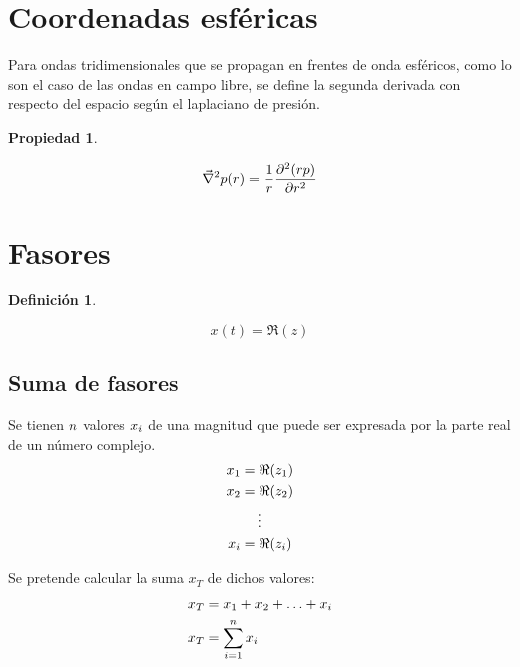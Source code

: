 \documentclass[a5paper,12pt,twoside]{book}
\newtheorem{defn}{{Definición}}[chapter]
\newtheorem{prop}{{Propiedad}}[chapter]
\begin{document}
\section{Coordenadas esféricas}

Para ondas tridimensionales que se propagan en frentes de onda esféricos, como lo son el caso de las ondas en campo libre, se define la segunda derivada con respecto del espacio según el laplaciano de presión.

\begin{mdframed}[style=MyFrame1]
    \begin{prop}
    \end{prop}
    \begin{equation*}
        \Vec{\nabla}^2 p(r) = \frac{1}{r} \frac{\partial^2 (rp)}{\partial r^2}
    \end{equation*}
\end{mdframed}


\section{Fasores}

\begin{mdframed}[style=MyFrame1]
    \begin{defn}
    \end{defn}
    \begin{equation*}
        x(t) = \Re (z)
    \end{equation*}
\end{mdframed}

\subsection{Suma de fasores}
Se tienen $n$ valores $x_i$ de una magnitud que puede ser expresada por la parte real de un número complejo.
\begin{gather*}
    x_1 = \Re(z_1)
    \\
    x_2 = \Re(z_2)
    \\
    \vdots
    \\
    x_i = \Re(z_i)
\end{gather*}

Se pretende calcular la suma $x_T$ de dichos valores:
\begin{align*}
    x_T &= x_1 + x_2 + \ldots + x_i
    \\
    x_T &=  \sum_{i=1}^n x_i
\end{align*}
\end{document}
